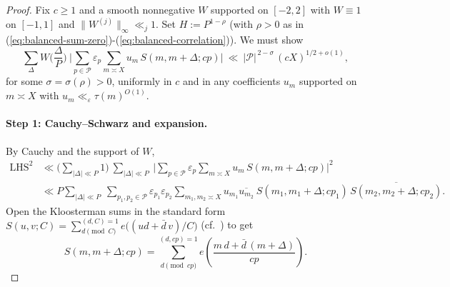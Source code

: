 \documentclass[11pt]{article}
\def\eqref#1{(\ref{#1})}%
\theoremstyle{definition}
\theoremstyle{remark}
\numberwithin{equation}{part}
\begin{document}
\begin{proof}
	Fix $c\ge1$ and a smooth nonnegative $W$ supported on $[-2,2]$ with $W\equiv1$ on $[-1,1]$ and $\|W^{(j)}\|_\infty\ll_j 1$.
	Set $H:=P^{1-\rho}$ (with $\rho>0$ as in \eqref{eq:balanced-sum-zero}-\eqref{eq:balanced-correlation}). We must show
	\begin{equation}\label{eq:passg-target}
		\sum_{\Delta} W\!\Big(\frac{\Delta}{P}\Big)\ \Bigg|\sum_{p\in\mathcal P}\varepsilon_p \sum_{m\asymp X} u_m\,S(m,m+\Delta;cp)\Bigg|
		\ \ll\ |\mathcal P|^{\,2-\sigma}\,(cX)^{1/2+o(1)} ,
	\end{equation}
	for some $\sigma=\sigma(\rho)>0$, uniformly in $c$ and in any coefficients $u_m$ supported on $m\asymp X$ with $u_m\ll_\varepsilon \tau(m)^{O(1)}$.

	\paragraph{Step 1: Cauchy--Schwarz and expansion.}
	By Cauchy and the support of $W$,
	\begin{align*}
		\text{LHS}^2
		 & \ll \Big(\sum_{|\Delta|\ll P}1\Big)\ \sum_{|\Delta|\ll P}\ \Bigg|\sum_{p\in\mathcal P}\varepsilon_p\sum_{m\asymp X} u_m\,S(m,m+\Delta;cp)\Bigg|^2 \\
		 & \ll P \sum_{|\Delta|\ll P}\ \sum_{p_1,p_2\in\mathcal P}\varepsilon_{p_1}\varepsilon_{p_2}
		\sum_{m_1,m_2\asymp X} u_{m_1}\overline{u_{m_2}}\ S(m_1,m_1+\Delta;cp_1)\,\overline{S(m_2,m_2+\Delta;cp_2)} .
	\end{align*}
	Open the Kloosterman sums in the standard form $S(u,v;C)=\sum_{d\!\!\pmod C}^{(d,C)=1} e\!\big((ud+\bar d\,v)/C\big)$ (cf.~\cite[Ch.~11, \S11.10]{IK}) to get
	\[
		S(m,m+\Delta;cp)=\sum_{d\!\!\pmod{cp}}^{(d,cp)=1} e\!\left(\frac{m\,d+\bar d\,(m+\Delta)}{cp}\right).
	\]


\end{proof}
\end{document}
